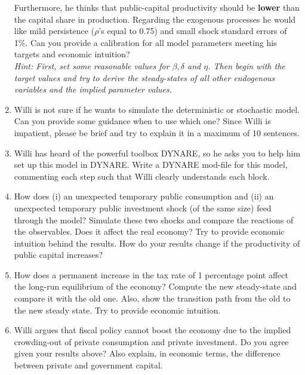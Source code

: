 \documentclass{article}
\begin{document}
\begin{enumerate}
       Furthermore, he thinks that public-capital productivity should be \textbf{lower} than the capital share in production. Regarding the exogenous processes he would like mild persistence ($\rho$'s equal to 0.75) and small shock standard errors of 1\%. Can you provide a calibration for all model parameters meeting his targets and economic intuition?\\
       \emph{Hint: First, set some reasonable values for $\beta,\delta$ and $\eta$. Then begin with the target values and try to derive the steady-states of all other endogenous variables and the implied parameter values.}
  \item Willi is not sure if he wants to simulate the deterministic or stochastic model. Can you provide some guidance when to use which one? Since Willi is impatient, please be brief and try to explain it in a maximum of 10 sentences.
  \item Willi has heard of the powerful toolbox DYNARE, so he asks you to help him set up this model in DYNARE. Write a DYNARE mod-file for this model, commenting each step such that Willi clearly understands each block.
  \item How does (i) an unexpected temporary public consumption and (ii) an unexpected temporary public investment shock (of the same size) feed through the model? Simulate these two shocks and compare the reactions of the observables. Does it affect the real economy? Try to provide economic intuition behind the results. How do your results change if the productivity of public capital increases?
  \item How does a permanent increase in the tax rate of 1 percentage point affect the long-run equilibrium of the economy? Compute the new steady-state and compare it with the old one. Also, show the transition path from the old to the new steady state. Try to provide economic intuition.
  \item Willi argues that fiscal policy cannot boost the economy due to the implied crowding-out of private consumption and private investment. Do you agree given your results above? Also explain, in economic terms, the difference between private and government capital.
\end{enumerate}

\newpage
\end{document}
